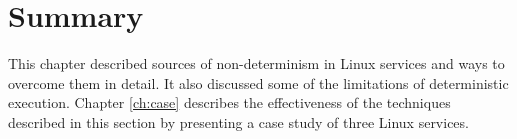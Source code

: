 \section {Summary}
This chapter described sources of non-determinism in Linux
services and ways to overcome them in detail.
It also discussed some of the limitations of deterministic
execution.
Chapter \ref{ch:case} describes the effectiveness
of the techniques described in this section
by presenting a case study of three Linux services.
